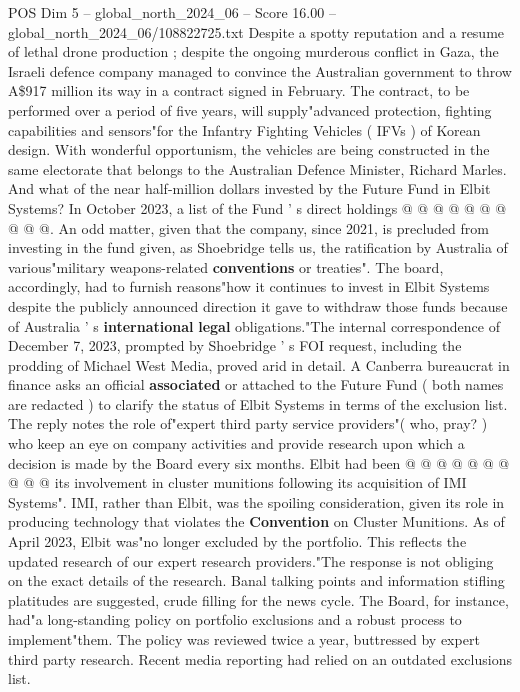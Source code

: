 \begin{textsample}{POS Dim 5 – global\_north\_2024\_06 – Score 16.00 – global\_north\_2024\_06/108822725.txt}
Despite a spotty reputation and a resume of lethal drone production ; despite the ongoing murderous conflict in Gaza, the Israeli defence company managed to convince the Australian government to throw A\$917 million its way in a contract signed in February.
The contract, to be performed over a period of five years, will supply"advanced protection, fighting capabilities and sensors"for the Infantry Fighting Vehicles ( IFVs ) of Korean design.
With wonderful opportunism, the vehicles are being constructed in the same electorate that belongs to the Australian Defence Minister, Richard Marles.
And what of the near half-million dollars invested by the Future Fund in Elbit Systems?
In October 2023, a list of the Fund ' s direct holdings @ @ @ @ @ @ @ @ @ @.
An odd matter, given that the company, since 2021, is precluded from investing in the fund given, as Shoebridge tells us, the ratification by Australia of various"military weapons-related \textbf{conventions} or treaties".
The board, accordingly, had to furnish reasons"how it continues to invest in Elbit Systems despite the publicly announced direction it gave to withdraw those funds because of Australia ' s \textbf{international} \textbf{legal} obligations."The internal correspondence of December 7, 2023, prompted by Shoebridge ' s FOI request, including the prodding of Michael West Media, proved arid in detail.
A Canberra bureaucrat in finance asks an official \textbf{associated} or attached to the Future Fund ( both names are redacted ) to clarify the status of Elbit Systems in terms of the exclusion list.
The reply notes the role of"expert third party service providers"( who, pray? ) who keep an eye on company activities and provide research upon which a decision is made by the Board every six months.
Elbit had been @ @ @ @ @ @ @ @ @ @ its involvement in cluster munitions following its acquisition of IMI Systems".
IMI, rather than Elbit, was the spoiling consideration, given its role in producing technology that violates the \textbf{Convention} on Cluster Munitions.
As of April 2023, Elbit was"no longer excluded by the portfolio.
This reflects the updated research of our expert research providers."The response is not obliging on the exact details of the research.
Banal talking points and information stifling platitudes are suggested, crude filling for the news cycle.
The Board, for instance, had"a long-standing policy on portfolio exclusions and a robust process to implement"them.
The policy was reviewed twice a year, buttressed by expert third party research.
Recent media reporting had relied on an outdated exclusions list.

\end{textsample}
